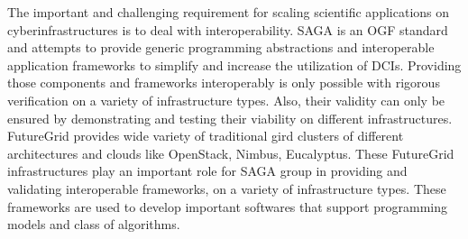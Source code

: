 \documentclass[]{paper}
\begin{document}
The important and challenging requirement for scaling scientific applications on cyberinfrastructures is to deal with interoperability.  SAGA is an OGF standard and attempts to provide generic programming abstractions and interoperable application frameworks to simplify and increase the utilization of DCIs. Providing those components and frameworks interoperably is only possible with rigorous verification on a variety of infrastructure types. Also, their validity can only be ensured by demonstrating and testing their viability on different infrastructures. FutureGrid provides wide variety of traditional gird clusters of different architectures and clouds like OpenStack, Nimbus, Eucalyptus.  These FutureGrid infrastructures play an important role for SAGA group in providing and validating interoperable frameworks, on a variety of infrastructure types.  These frameworks are used to develop important softwares that support programming models and class of algorithms. 
\end{document}
